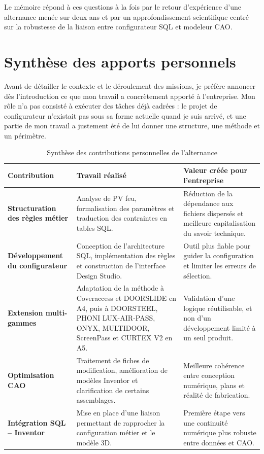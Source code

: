 Le mémoire répond à ces questions à la fois par le retour d'expérience d'une alternance menée sur deux ans et par un approfondissement scientifique centré sur la robustesse de la liaison entre configurateur SQL et modeleur CAO.

\section{Synthèse des apports personnels}

Avant de détailler le contexte et le déroulement des missions, je préfère annoncer dès l'introduction ce que mon travail a concrètement apporté à l'entreprise. Mon rôle n'a pas consisté à exécuter des tâches déjà cadrées : le projet de configurateur n'existait pas sous sa forme actuelle quand je suis arrivé, et une partie de mon travail a justement été de lui donner une structure, une méthode et un périmètre.

\begin{table}[H]
\centering
\caption{Synthèse des contributions personnelles de l'alternance}
\begin{tabularx}{\textwidth}{>{\bfseries}p{}X X}
\toprule
Contribution & Travail réalisé & Valeur créée pour l'entreprise \\
\midrule
Structuration des règles métier & Analyse de PV feu, formalisation des paramètres et traduction des contraintes en tables SQL. & Réduction de la dépendance aux fichiers dispersés et meilleure capitalisation du savoir technique. \\
Développement du configurateur & Conception de l'architecture SQL, implémentation des règles et construction de l'interface Design Studio. & Outil plus fiable pour guider la configuration et limiter les erreurs de sélection. \\
Extension multi-gammes & Adaptation de la méthode à Coveraccess et DOORSLIDE en A4, puis à DOORSTEEL, PHONI LUX-AIR-PASS, ONYX, MULTIDOOR, ScreenPass et CURTEX V2 en A5. & Validation d'une logique réutilisable, et non d'un développement limité à un seul produit. \\
Optimisation CAO & Traitement de fiches de modification, amélioration de modèles Inventor et clarification de certains assemblages. & Meilleure cohérence entre conception numérique, plans et réalité de fabrication. \\
Intégration SQL -- Inventor & Mise en place d'une liaison permettant de rapprocher la configuration métier et le modèle 3D. & Première étape vers une continuité numérique plus robuste entre données et CAO. \\
\bottomrule
\end{tabularx}
\end{table}

